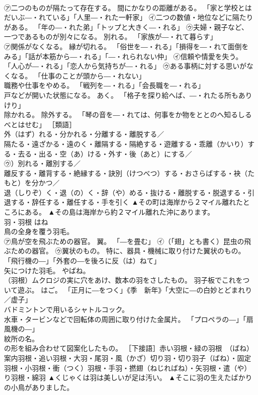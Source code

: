 \documentclass[8pt]{extreport}
\begin{document}
\begin{CJK}{UTF8}{min}
\\	㋐二つのものが隔たって存在する。 間にかなりの距離がある。 「家と学校とはだいぶ―・れている」「人里―・れた一軒家」 ㋑二つの数値・地位などに隔たりがある。 「年の―・れた弟」「トップと大きく―・れる」 ㋒夫婦・親子など、一つであるものが別々になる。 別れる。 「家族が―・れて暮らす」 
\\	㋐関係がなくなる。 縁が切れる。 「俗世を―・れる」「損得を―・れて面倒をみる」「話が本筋から―・れる」「―・れられない仲」 ㋑信頼や情愛を失う。 「人心が―・れる」「恋人から気持ちが―・れる」 ㋒ある事柄に対する思いがなくなる。 「仕事のことが頭から―・れない」 
\\	職務や仕事をやめる。 「戦列を―・れる」「会長職を―・れる」 
\\	戸などが開いた状態になる。 あく。 「格子を探り給へば、―・れたる所もありけり」 
\\	除かれる。 除外する。 「琴の音を―・れては、何事をか物をととのへ知るしるべとはせむ」 ［類語］
\\	外（はず）れる・分かれる・分離する・離脱する／
\\	隔たる・遠ざかる・遠のく・離隔する・隔絶する・遊離する・乖離（かいり）する・去る・出る・空（あ）ける・外す・後（あと）にする／
\\	㋒）別れる・離別する／
\\	離反する・離背する・絶縁する・訣別（けつべつ）する・おさらばする・袂（たもと）を分かつ／
\\	退（しりぞ）く・退（の）く・辞（や）める・抜ける・離脱する・脱退する・引退する・辞任する・離任する・手を引く	▲その町は海岸から２マイル離れたところにある。 ▲その島は海岸から約２マイル離れた沖にあります。
\\	羽・羽根	はね	
\\	鳥の全身を覆う羽毛。 
\\	㋐鳥が空を飛ぶための器官。 翼。 「―を畳む」 ㋑（「翅」とも書く）昆虫の飛ぶための器官。 ㋒翼状のもの。 特に、器具・機械に取り付けた翼状のもの。 「飛行機の―」「外套の―を後ろに反（は）ねて」 
\\	矢につけた羽毛。 やばね。 
\\	（羽根）ムクロジの実に穴をあけ、数本の羽をさしたもの。 羽子板でこれをついて遊ぶ。 はご。 「正月に―をつく」《季　新年》「大空に―の白妙とどまれり／虚子」 
\\	バドミントンで用いるシャトルコック。 
\\	水車・タービンなどで回転体の周囲に取り付けた金属片。 「プロペラの―」「扇風機の―」 
\\	紋所の名。 
\\	の形を組み合わせて図案化したもの。 ［下接語］赤い羽根・緑の羽根　（ばね）案内羽根・追い羽根・大羽・尾羽・風（かざ）切り羽・切り羽子（ばね）・固定羽根・小羽根・衝（つく）羽根・手羽・撚翅（ねじればね）・矢羽根・遣（や）り羽根・綿羽	▲くじゃくは羽は美しいが足は汚い。 ▲そこに羽の生えたばかりの小鳥がありました。

\end{CJK}
\end{document}
